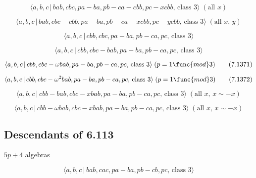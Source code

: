 \documentclass[10pt]{article}
\begin{document}
\begin{equation}
\langle a,b,c\,|\,bab,cbc,pa-ba,pb-ca-cbb,pc-xcbb,\,\text{class }3\rangle \;(%
\text{all }x)  \tag{7.1367}
\end{equation}

\begin{equation}
\langle a,b,c\,|\,bab,cbc-cbb,pa-ba,pb-ca-xcbb,pc-ycbb,\,\text{class }%
3\rangle \;(\text{all }x,\,y)  \tag{7.1368}
\end{equation}

\begin{equation}
\langle a,b,c\,|\,cbb,cbc,pa-ba,pb-ca,pc,\,\text{class }3\rangle 
\tag{7.1369}
\end{equation}

\begin{equation}
\langle a,b,c\,|\,cbb,cbc-bab,pa-ba,pb-ca,pc,\,\text{class }3\rangle 
\tag{7.1370}
\end{equation}

\begin{equation}
\langle a,b,c\,|\,cbb,cbc-\omega bab,pa-ba,pb-ca,pc,\,\text{class }3\rangle
\;(p=1\func{mod}3)  \tag{7.1371}
\end{equation}

\begin{equation}
\langle a,b,c\,|\,cbb,cbc-\omega ^{2}bab,pa-ba,pb-ca,pc,\,\text{class }%
3\rangle \;(p=1\func{mod}3)  \tag{7.1372}
\end{equation}

\begin{equation}
\langle a,b,c\,|\,cbb-bab,cbc-xbab,pa-ba,pb-ca,pc,\,\text{class }3\rangle \;(%
\text{all }x,\,x\sim -x)  \tag{7.1373}
\end{equation}

\begin{equation}
\langle a,b,c\,|\,cbb-\omega bab,cbc-xbab,pa-ba,pb-ca,pc,\,\text{class }%
3\rangle \;(\text{all }x,\,x\sim -x)  \tag{7.1374}
\end{equation}

\subsection{Descendants of 6.113}

$5p+4$ algebras

\begin{equation}
\langle a,b,c\,|\,bab,cac,pa-ba,pb-cb,pc,\,\text{class }3\rangle 
\tag{7.1375}
\end{equation}
\end{document}
